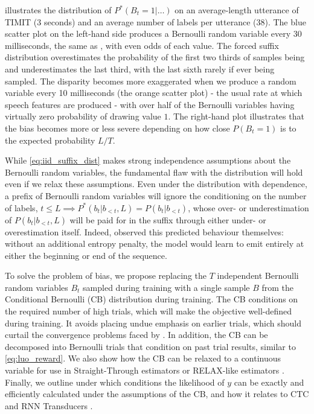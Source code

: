 \documentclass{article}
\begin{document}
 illustrates the distribution of $P^*(B_t=1|\ldots)$ on an
average-length utterance of TIMIT (3 seconds) and an average number of labels
per utterance (38). The blue scatter plot on the left-hand side produces a
Bernoulli random variable every 30 milliseconds, the same as
\citet{luoLearningOnlineAlignments2017}, with even odds of each value. The
forced suffix distribution overestimates the probability of the first two
thirds of samples being and underestimates the last third, with the last sixth
rarely if ever being sampled. The disparity becomes more exaggerated when we
produce a random variable every 10 milliseconds (the orange scatter plot) -
the usual rate at which speech features are produced - with over half of the
Bernoulli variables having virtually zero probability of drawing value $1$. The
right-hand plot illustrates that the bias becomes more or less severe depending
on how close $P(B_t=1)$ is to the expected probability $L / T$.

While \cref{eq:iid_suffix_dist} makes strong independence assumptions about the
Bernoulli random variables, the fundamental flaw with the distribution will
hold even if we relax these assumptions. Even under the distribution with
dependence, a prefix of Bernoulli random variables will ignore the conditioning
on the number of labels, $t \leq L \implies P^*(b_t|b_{<t}, L) =
P(b_t|b_{<t})$, whose over- or underestimation of $P(b_t|b_{<t}, L)$ will be
paid for in the suffix through either under- or overestimation itself. Indeed,
\citet{luoLearningOnlineAlignments2017} observed this predicted behaviour
themselves: without an additional entropy penalty, the model would learn to
emit entirely at either the beginning or end of the sequence.

To solve the problem of bias, we propose replacing the $T$ independent
Bernoulli random variables $B_t$ sampled during training with a single sample
$B$ from the Conditional Bernoulli (CB) distribution during training. The CB
conditions on the required number of high trials, which will make the objective
well-defined during training. It avoids placing undue emphasis on earlier
trials, which should curtail the convergence problems faced by
\citet{luoLearningOnlineAlignments2017}. In addition, the CB can be decomposed
into Bernoulli trials that condition on past trial results, similar to
\cref{eq:luo_reward}. We also show how the CB can be relaxed to a continuous
variable for use in Straight-Through estimators
\cite{bengioEstimatingPropagatingGradients2013,jangCategoricalReparameterizationGumbelSoftmax2017}
or RELAX-like estimators
\cite{maddisonConcreteDistributionContinuous2017,grathwohlBackpropagationVoidOptimizing2018}.
Finally, we outline under which conditions the likelihood of $y$ can be exactly
and efficiently calculated under the assumptions of the CB, and how it relates
to CTC and RNN Transducers \cite{gravesSequenceTransductionRecurrent2012}.
\end{document}
